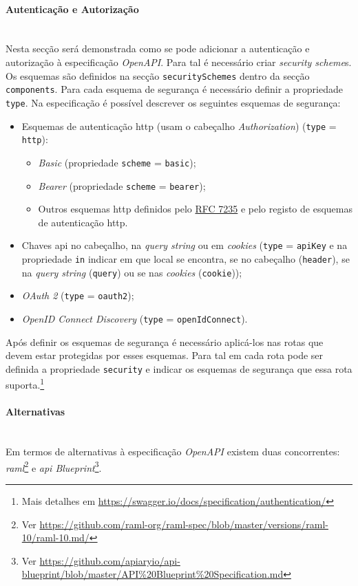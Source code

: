 \paragraph{Autenticação e Autorização}\label{sec:authSwagger} \mbox{} \\
Nesta secção será demonstrada como se pode adicionar a autenticação e autorização à especificação \textit{OpenAPI}. 
Para tal é necessário criar \textit{security scheme}s. Os esquemas são definidos na secção 
\texttt{securitySchemes} dentro da secção \texttt{components}. 
Para cada esquema de segurança é necessário definir a propriedade \texttt{type}. 
Na especificação é possível descrever os seguintes esquemas de segurança:
\begin{itemize}
    \item Esquemas de autenticação \acrshort{http} (usam o cabeçalho \textit{Authorization}) (\texttt{type} = \texttt{http}):
    \begin{itemize}
        \item \textit{Basic} (propriedade \texttt{scheme} = \texttt{basic});
        \item \textit{Bearer} (propriedade \texttt{scheme} = \texttt{bearer});
        \item Outros esquemas \acrshort{http} definidos pelo \href{https://tools.ietf.org/html/rfc7235}{RFC 7235} 
        e pelo registo de esquemas de autenticação \acrshort{http}.
    \end{itemize}
    \item Chaves \acrshort{api} no cabeçalho, na \textit{query string} ou em \textit{cookies} 
    (\texttt{type} = \texttt{apiKey} e na propriedade \texttt{in} indicar em que local se encontra, se no 
    cabeçalho (\texttt{header}), se na \textit{query string} (\texttt{query}) ou se nas \textit{cookies} 
    (\texttt{cookie}));
    \item \textit{OAuth 2} (\texttt{type} = \texttt{oauth2});
    \item \textit{OpenID Connect Discovery} (\texttt{type} = \texttt{openIdConnect}).
\end{itemize}

Após definir os esquemas de segurança é necessário aplicá-los nas rotas que devem estar protegidas 
por esses esquemas. Para tal em cada rota pode ser definida a propriedade \texttt{security} e indicar 
os esquemas de segurança que essa rota 
suporta.\footnote{Mais detalhes em \url{https://swagger.io/docs/specification/authentication/}}

\paragraph{Alternativas} \mbox{} \\
Em termos de alternativas à especificação \textit{OpenAPI} existem duas 
concorrentes: \textit{\acrshort{raml}}\footnote{Ver \url{https://github.com/raml-org/raml-spec/blob/master/versions/raml-10/raml-10.md/}} e \textit{\acrshort{api} Blueprint}\footnote{Ver \url{https://github.com/apiaryio/api-blueprint/blob/master/API\%20Blueprint\%20Specification.md}}.

